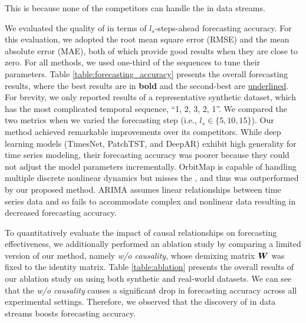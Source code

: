 This is because none of the competitors can handle the \relation in data streams.
\par
\TSK{

}
\noindent
{}
We evaluated the quality of \method in terms of $l_s$-steps-ahead forecasting accuracy.
For this evaluation, we adopted the root mean square error (RMSE) and the mean absolute error (MAE),
both of which provide good results when they are close to zero.
For all methods, we used one-third of the sequences to tune their parameters.
Table \ref{table:forecasting_accuracy} presents the overall forecasting results,
where the best results are in \textbf{bold} and the second-best are \underline{underlined}.
For brevity, we only reported results of a representative synthetic dataset, which has the most complicated temporal sequence, ``1, 2, 3, 2, 1''.
We compared the two metrics
when we varied the forecasting step
(i.e., $l_s \in \{5, 10, 15\}$).
Our method achieved remarkable improvements over its competitors.
While deep learning models (TimesNet, PatchTST, and DeepAR)
exhibit high generality for time series modeling,
their forecasting accuracy was poorer
because they could not adjust the model parameters incrementally.
OrbitMap is capable of handling multiple discrete nonlinear dynamics but
misses the \relation,
and thus was outperformed by our proposed method.
ARIMA assumes linear relationships between time series data
and so fails to accommodate complex and nonlinear data
resulting in decreased forecasting accuracy.
\par
{}
To quantitatively evaluate the impact of causal relationships on forecasting effectiveness,
we additionally performed an ablation study by comparing a limited version of our method, namely \textit{w/o causality},
whose demixing matrix $\bm{W}$ was fixed to the identity matrix.
Table \ref{table:ablation} presents the overall results of our ablation study on \method using both synthetic and real-world datasets.
We can see that the \textit{w/o causality} causes a significant drop in forecasting accuracy across all experimental settings.
Therefore, we observed that the discovery of \relation in data streams boosts forecasting accuracy.
\TSK{

}
\par\noindent
